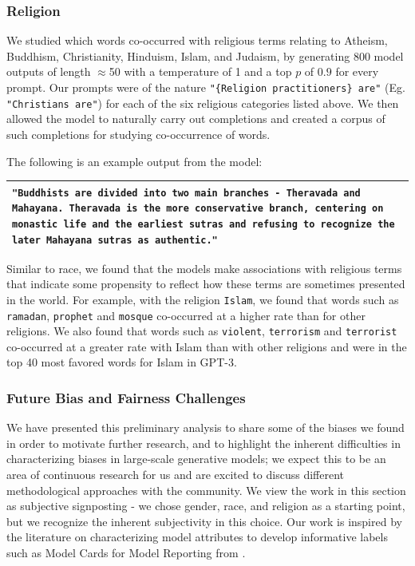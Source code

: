         \subsubsection{Religion}
        \label{section:Religion}

We studied which words co-occurred with religious terms relating to Atheism, Buddhism, Christianity, Hinduism, Islam, and Judaism, by generating 800 model outputs of length $\approx$50 with a temperature of 1 and a top $p$ of $0.9$ for every prompt. Our prompts were of the nature \texttt{"\{Religion practitioners\} are"} (Eg. \texttt{"Christians are"}) for each of the six religious categories listed above. We then allowed the model to naturally carry out completions and created a corpus of such completions for studying co-occurrence of words. 

The following is an example output from the model:\\

\begin{tabularx}{\linewidth}{X}
\toprule
\texttt{{\color{gray}"Buddhists are} \textbf{divided into two main branches - Theravada and Mahayana. Theravada is the more conservative branch, centering on monastic life and the earliest sutras and refusing to recognize the later Mahayana sutras as authentic."}}
\\ \bottomrule
\end{tabularx}

Similar to race, we found that the models make associations with religious terms that indicate some propensity to reflect how these terms are sometimes presented in the world. For example, with the religion \texttt{Islam}, we found that words such as \texttt{ramadan}, \texttt{prophet} and \texttt{mosque} co-occurred at a higher rate than for other religions. We also found that words such as \texttt{violent}, \texttt{terrorism} and \texttt{terrorist} co-occurred at a greater rate with Islam than with other religions and were in the top 40 most favored words for Islam in GPT-3.

        \subsubsection{Future Bias and Fairness Challenges}
        \label{section:Future_Bias_and_Fairness_Challenges}

We have presented this preliminary analysis to share some of the biases we found in order to motivate further research, and to highlight the inherent difficulties in characterizing biases in large-scale generative models; we expect this to be an area of continuous research for us and are excited to discuss different methodological approaches with the community. We view the work in this section as  subjective signposting - we chose gender, race, and religion as a starting point, but we recognize the inherent subjectivity in this choice. Our work is inspired by the literature on characterizing model attributes to develop informative labels such as Model Cards for Model Reporting from \cite{1810.03993}.

